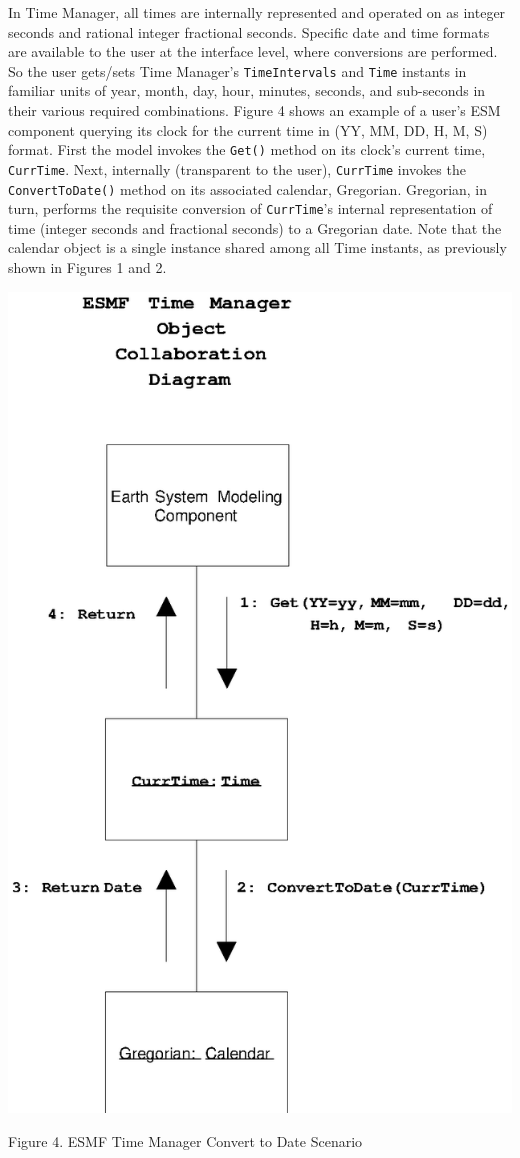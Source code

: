 

In Time Manager, all times are internally represented and operated on as
integer seconds and rational integer fractional seconds.  Specific date and
time formats are available to the user at the interface level, where
conversions are performed.  So the user gets/sets Time Manager's
{\tt TimeIntervals} and {\tt Time} instants in familiar units of year, month,
day, hour, minutes, seconds, and sub-seconds in their various required
combinations.  Figure 4 shows an example of a user's ESM component querying
its clock for the current time in (YY, MM, DD, H, M, S) format.  First the
model invokes the {\tt Get()} method on its clock's current time,
{\tt CurrTime}.  Next, internally (transparent to the user), {\tt CurrTime}
invokes the {\tt ConvertToDate()} method on its associated calendar, Gregorian.
Gregorian, in turn, performs the requisite conversion of {\tt CurrTime}'s
internal representation of time (integer seconds and fractional seconds)
to a Gregorian date.  Note that the calendar object is a single instance
shared among all Time instants, as previously shown in Figures 1 and 2.

\begin{center}
\includegraphics{TimeMgrOCD2.EPS}
   
Figure 4.  ESMF Time Manager Convert to Date Scenario
   
\end{center}
